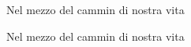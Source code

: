 \documentclass{minimal}
\begin{document}
\begin{minipage}{1sp}
Nel mezzo del cammin di nostra vita
\end{minipage}


\begin{minipage}{1sp}
Nel mezzo del cammin di nostra vita
\end{minipage}
\end{document}
